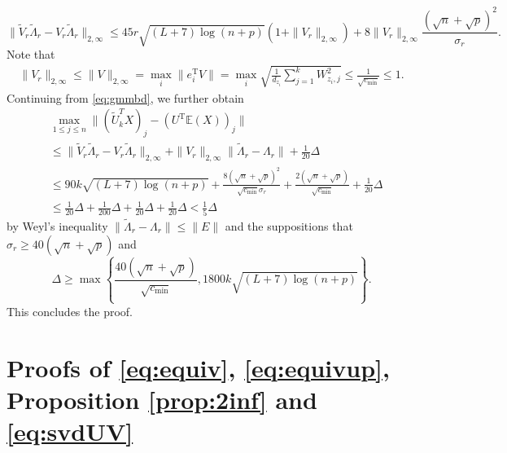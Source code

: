 \documentclass[reqno]{amsart}
\newcommand{\E}{\mathbb{E}}
\newcommand{\T}{\mathrm{T}}
\theoremstyle{plain}
\theoremstyle{definition}
\begin{document}
$$\| \widetilde{V}_{r}\widetilde{\Lambda}_{r} - V_r \widetilde{\Lambda}_{r}\|_{2,\infty} \le 45 r \sqrt{(L+7)\log (n+p)} (1+\|V_r\|_{2,\infty})+ 8 \|V_r\|_{2,\infty} \frac{(\sqrt n + \sqrt p)^2}{\sigma_r}.$$
Note that 
\begin{align*}
\|V_r\|_{2,\infty}\le \|V\|_{2,\infty}=\max_{i} \|e_i^\T V\| =\max_{i} \sqrt{\frac{1}{d_{z_i}} \sum_{j=1}^k W_{z_i, j}^2}\le \frac{1}{\sqrt{c_{\min}}}\le 1.
\end{align*}
Continuing from \eqref{eq:gmmbd}, we further obtain
\begin{align*}
&\max_{1\le j \le n}\|(\widetilde U_{k}^T X)_j - (U^\T \E (X))_j\|\\
&\le \| {\widetilde V_r} {\widetilde \Lambda_r} - V_r \widetilde{\Lambda}_r\|_{2,\infty} + \| V_r\|_{2,\infty} \|\widetilde{\Lambda}_r -  \Lambda_r\| + \frac{1}{20}\Delta\\
&\le 90 k \sqrt{(L+7)\log (n+p)} + \frac{8(\sqrt n + \sqrt p)^2}{\sqrt{c_{\min}} \sigma_r} + \frac{2(\sqrt n + \sqrt p)}{\sqrt{c_{\min}}} + \frac{1}{20}\Delta\\
&\le \frac{1}{20}\Delta + \frac{1}{200}\Delta + \frac{1}{20}\Delta + \frac{1}{20}\Delta<\frac{1}{5}\Delta
\end{align*}
by Weyl's inequality $\|\widetilde{\Lambda}_r -  \Lambda_r\|\le \|E\|$ and the suppositions that $\sigma_r\ge 40(\sqrt n + \sqrt p)$ and 
$$\Delta \ge \max\left\{ \frac{40(\sqrt n + \sqrt p)}{\sqrt{c_{\min}}}, 1800k\sqrt{(L+7)\log(n+p)}  \right\}.$$This concludes the proof.



\section{Proofs of \eqref{eq:equiv}, \eqref{eq:equivup}, Proposition \ref{prop:2inf} and \eqref{eq:svdUV}}\label{sec:otherproofs}
\end{document}
